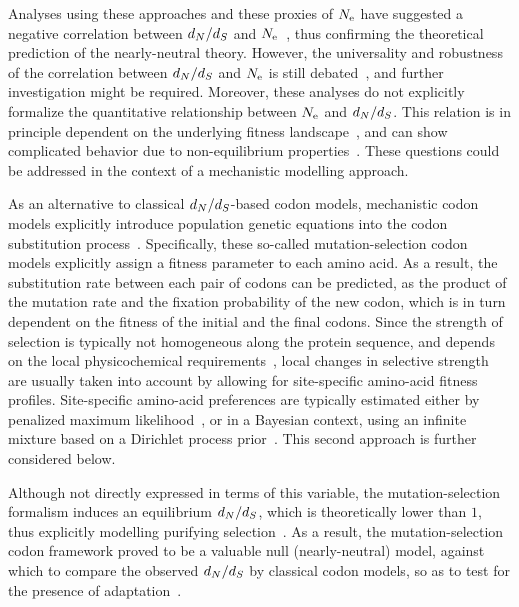 \documentclass{MBE}
\begin{document}
	Analyses using these approaches and these proxies of $N_{\text{e}}$ have suggested a negative correlation between $d_N / d_S$ and $N_{\text{e}}$~\citep{Popadin2007, Lanfear2010, Lartillot2011, Lartillot2012, Romiguier2014, Figuet2017}, thus confirming the theoretical prediction of the {nearly-neutral} theory.
	However, the universality and robustness of the correlation between $d_N / d_S$ and $N_{\text{e}}$ is still debated~\citep{Nabholz2013,Lanfear2014,Figuet2016, Bolivar2019}, and further investigation might be required.
	Moreover, these analyses do not explicitly formalize the quantitative relationship between $N_{\text{e}}$ and $d_N / d_S$.
	This relation is in principle dependent on the underlying fitness landscape~\citep{Welch2008, Cherry1998, Goldstein2011}, and can show complicated behavior due to non-equilibrium properties~\citep{Jones2016}.
	These questions could be addressed in the context of a mechanistic modelling approach.

	As an alternative to classical $d_N / d_S$-based {codon} models, mechanistic {codon} models explicitly introduce population genetic equations into the {codon} {substitution} process~\citep{Halpern1998}.
	Specifically, these so-called mutation-selection {codon} models explicitly assign a fitness parameter to each amino acid.
	As a result, the {substitution} rate between each pair of codons can be predicted, as the product of the mutation rate and the fixation probability of the new {codon}, which is in turn dependent on the fitness of the initial and the final codons.
	Since the strength of selection is typically not homogeneous along the protein sequence, and depends on the local physicochemical requirements~\citep{Echave2016, Goldstein2016,Goldstein2017}, local changes in selective strength are usually taken into account by allowing for site-specific amino-acid fitness profiles.
	Site-specific amino-acid preferences are typically estimated either by penalized maximum likelihood~\citep{Tamuri2012,Tamuri2014}, or in a Bayesian context, using an infinite mixture based on a {Dirichlet process} prior~\citep{Rodrigue2010,Rodrigue2014}.
	This second approach is further considered below.

	Although not directly expressed in terms of this variable, the mutation-selection formalism induces an equilibrium $d_N / d_S$, which is theoretically lower than $1$, thus explicitly modelling purifying selection~\citep{Spielman2015, DosReis2015}.
	As a result, the mutation-selection codon framework proved to be a valuable null (nearly-neutral) model, against which to compare the observed $d_N / d_S$ by classical {codon} models, so as to test for the presence of adaptation~\citep{Rodrigue2016, Bloom2017}.
\end{document}
